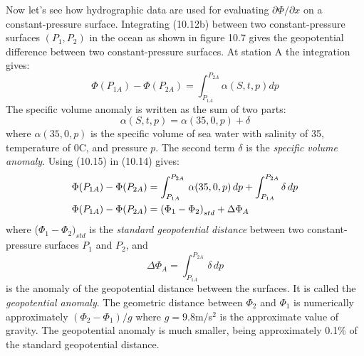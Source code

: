 Now let's see how hydrographic data are used
for evaluating $\partial
\Phi/\partial x$ on a constant-pressure surface. Integrating (10.12b) between two constant-pressure surfaces $\left( P_1 , P_2
\right)$ in the ocean as shown in figure 10.7 gives the geopotential difference
between two constant-pressure surfaces. At station A the integration gives:
\begin{equation}
\Phi\left(P_{1A}\right)-\Phi\left(P_{2A}\right)=\int_{P_{1A}}^{P_{2A}}
\alpha\left(S,t,p\right)dp
\end{equation}
The specific volume anomaly is written as the sum of two parts:
\begin{equation}
\alpha(S,t,p)=\alpha(35,0,p)+\delta
\end{equation}
where $\alpha (35,0,p)$ is the specific volume of sea water with salinity of 35,
temperature of 0\degrees C, and pressure $p$. The second term $\delta$ is the
\textit{specific volume anomaly}. Using (10.15) in
(10.14) gives:
\begin{align}
\Phi(P_{1A})-\Phi(P_{2A})&=\int_{P_{1A}}^{P_{2A}}\,\alpha(35,0,p)\, dp +\int_{P_{1A}}^{P_{2A}}
\delta \,dp \notag \\
\Phi(P_{1A})-\Phi(P_{2A})&=\left(\Phi_1-\Phi_2 \right)_{std}
+\Delta\Phi_A \notag
\end{align}
where ($\Phi_1-\Phi_2 )_{std}$ is the \textit{standard
geopotential distance} between two
constant-pressure surfaces $P_1$ and $P_2$, and
\begin{equation}
\Delta\Phi_A =\int_{P_{1A}}^{P_{2A}} \,\delta\, dp
\end{equation}
is the anomaly of the geopotential distance between the surfaces. It is called the
\textit{geopotential anomaly}. The geometric distance
between $\Phi_2$ and $\Phi_1$ is numerically approximately $(\Phi_2 - \Phi_1) /g$ where
$g= 9.8$m/s$^2$ is the approximate value of gravity. The geopotential anomaly is much
smaller, being approximately 0.1\% of the standard geopotential distance.

